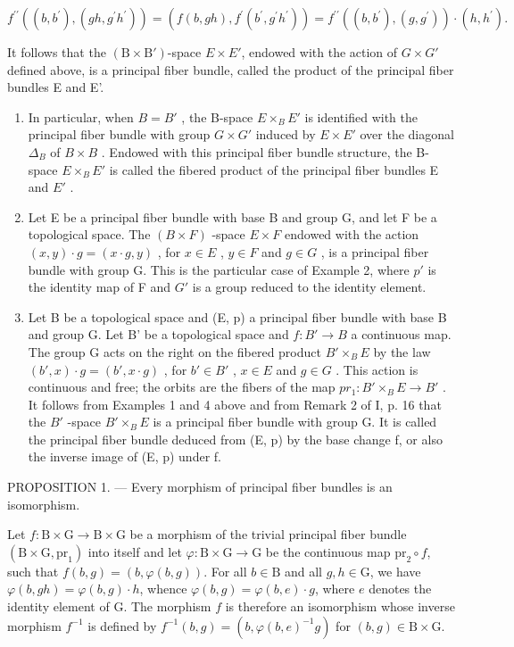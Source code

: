 \[
f ^ {\prime \prime} ((b, b ^ {\prime}), (g h, g ^ {\prime} h ^ {\prime})) = (f (b, g h), f ^ {\prime} (b ^ {\prime}, g ^ {\prime} h ^ {\prime})) = f ^ {\prime \prime} ((b, b ^ {\prime}), (g, g ^ {\prime})) \cdot (h, h ^ {\prime}).
\]

It follows that the \((\mathrm{B} \times \mathrm{B}')\)-space \(E \times E'\), endowed with the action of \(G \times G'\) defined above, is a principal fiber bundle, called the product of the principal fiber bundles E and E'.

\begin{enumerate}
\def\labelenumi{\arabic{enumi})}
\setcounter{enumi}{2}
\item
  In particular, when \(B = B'\) , the B-space \(E \times_{B} E'\) is identified with the principal fiber bundle with group \(G \times G'\) induced by \(E \times E'\) over the diagonal \(\Delta_{B}\) of \(B \times B\) . Endowed with this principal fiber bundle structure, the B-space \(E \times_{B} E'\) is called the fibered product of the principal fiber bundles E and \(E'\) .
\item
  Let E be a principal fiber bundle with base B and group G, and let F be a topological space. The \((B \times F)\) -space \(E \times F\) endowed with the action \((x, y) \cdot g = (x \cdot g, y)\) , for \(x \in E\) , \(y \in F\) and \(g \in G\) , is a principal fiber bundle with group G. This is the particular case of Example 2, where \(p'\) is the identity map of F and \(G'\) is a group reduced to the identity element.
\item
  Let B be a topological space and (E, p) a principal fiber bundle with base B and group G. Let B' be a topological space and \(f: B' \to B\) a continuous map. The group G acts on the right on the fibered product \(B' \times_{B} E\) by the law \((b', x) \cdot g = (b', x \cdot g)\) , for \(b' \in B'\) , \(x \in E\) and \(g \in G\) . This action is continuous and free; the orbits are the fibers of the map \(pr_{1}: B' \times_{B} E \to B'\) . It follows from Examples 1 and 4 above and from Remark 2 of I, p. 16 that the \(B'\) -space \(B' \times_{B} E\) is a principal fiber bundle with group G. It is called the principal fiber bundle deduced from (E, p) by the base change f, or also the inverse image of (E, p) under f.
\end{enumerate}

PROPOSITION 1. --- Every morphism of principal fiber bundles is an isomorphism.

Let \(f \colon \mathrm{B} \times \mathrm{G} \to \mathrm{B} \times \mathrm{G}\) be a morphism of the trivial principal fiber bundle \((\mathrm{B} \times \mathrm{G},\mathrm{pr}_1)\) into itself and let \(\varphi \colon \mathrm{B} \times \mathrm{G} \to \mathrm{G}\) be the continuous map \(\mathrm{pr}_2 \circ f\), such that \(f(b, g) = (b, \varphi(b, g))\). For all \(b \in \mathrm{B}\) and all \(g, h \in \mathrm{G}\), we have \(\varphi(b, gh) = \varphi(b, g) \cdot h\), whence \(\varphi(b, g) = \varphi(b, e) \cdot g\), where \(e\) denotes the identity element of \(\mathrm{G}\). The morphism \(f\) is therefore an isomorphism whose inverse morphism \(f^{-1}\) is defined by \(f^{-1}(b, g) = (b, \varphi(b, e)^{-1}g)\) for \((b, g) \in \mathrm{B} \times \mathrm{G}\).

